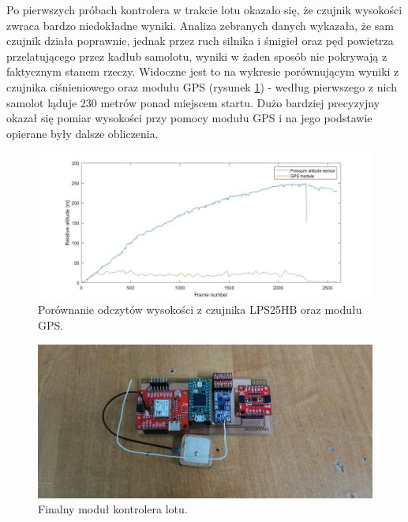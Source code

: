 \documentclass[12pt, a4paper]{article}
\begin{document}
Po pierwszych próbach kontrolera w trakcie lotu okazało się, że czujnik wysokości zwraca bardzo niedokładne wyniki. Analiza zebranych danych wykazała, że sam czujnik działa poprawnie, jednak przez ruch silnika i śmigieł oraz pęd powietrza przelatującego przez kadłub samolotu, wyniki w żaden sposób nie pokrywają z faktycznym stanem rzeczy. Widoczne jest to na wykresie porównującym wyniki z czujnika ciśnieniowego oraz modułu GPS (rysunek \ref{fig:alti}) - według pierwszego z nich samolot ląduje 230 metrów ponad miejscem startu. Dużo bardziej precyzyjny okazał się pomiar wysokości przy pomocy modułu GPS i na jego podstawie opierane były dalsze obliczenia.

\begin{figure}[ht]
    \centering
    \includegraphics[width=1\textwidth]{alti}
    \caption{Porównanie odczytów wysokości z czujnika LPS25HB oraz modułu GPS.}
    \label{fig:alti}
\end{figure}

   \begin{figure}[ht]
    \centering
    \includegraphics[width=1\textwidth]{dodokontroler}
    \caption{Finalny moduł kontrolera lotu.}
    \label{fig:dodokontroler}
\end{figure}
\end{document}
